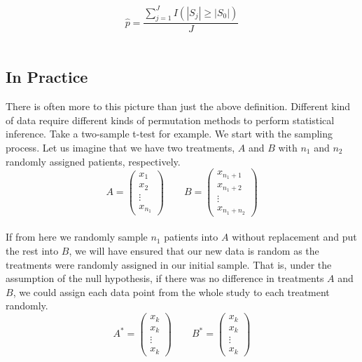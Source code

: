 $$
\hat{p}=\frac{\sum_{j=1}^{J}I(|S_j|\geq|S_0|)}{J} %
$$
\\
\subsection{In Practice}
There is often more to this picture than just the above definition. Different kind of data require different kinds of permutation methods to perform statistical inference. Take a two-sample t-test for example.  We start with the sampling process. Let us imagine that we have two treatments, $A$ and $B$ with $n_1$ and $n_2$ randomly assigned patients, respectively. 
\\
$$
    A=\begin{pmatrix}
        x_{1}\\
        x_{2}\\
        \vdots\\
        x_{n_1}
    \end{pmatrix}\quad\quad
    B=\begin{pmatrix}
        x_{n_1+1}\\
        x_{n_1+2}\\
        \vdots\\
        x_{n_1+n_2}
    \end{pmatrix} 
$$
\newline\\
If from here we randomly sample $n_1$ patients into $A$ without replacement and put the rest into $B$, we will have ensured that our new data is random as the treatments were randomly assigned in our initial sample. That is, under the assumption of the null hypothesis, if there was no difference in treatments $A$ and $B$, we could assign each data point from the whole study to each treatment randomly. 
\\
$$
    A^*=\begin{pmatrix}
        x_{k}\\
        x_{k}\\
        \vdots\\
        x_{k}
    \end{pmatrix}\quad\quad
    B^*=\begin{pmatrix}
        x_{k}\\
        x_{k}\\
        \vdots\\
        x_{k}
    \end{pmatrix} 
$$
\newline\\

